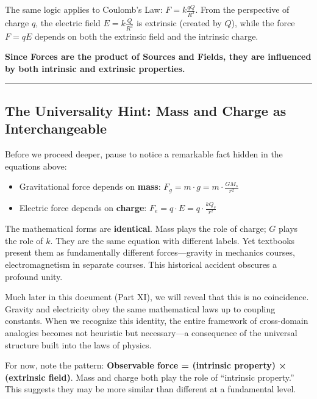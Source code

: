 \documentclass[
]{article}
\providecommand{\tightlist}{%
  \setlength{\itemsep}{0pt}\setlength{\parskip}{0pt}}
\begin{document}
The same logic applies to Coulomb's Law: \(F = k\frac{qQ}{R^2}\). From
the perspective of charge \(q\), the electric field
\(E = k\frac{Q}{R^2}\) is extrinsic (created by \(Q\)), while the force
\(F = qE\) depends on both the extrinsic field and the intrinsic charge.

\textbf{Since Forces are the product of Sources and Fields, they are
influenced by both intrinsic and extrinsic properties.}

\begin{center}\rule{0.5\linewidth}{0.5pt}\end{center}

\subsection{The Universality Hint: Mass and Charge as
Interchangeable}\label{the-universality-hint-mass-and-charge-as-interchangeable}

Before we proceed deeper, pause to notice a remarkable fact hidden in
the equations above:

\begin{itemize}
\tightlist
\item
  Gravitational force depends on \textbf{mass}:
  \(F_g = m \cdot g = m \cdot \frac{GM_s}{r^2}\)
\item
  Electric force depends on \textbf{charge}:
  \(F_e = q \cdot E = q \cdot \frac{kQ_s}{r^2}\)
\end{itemize}

The mathematical forms are \textbf{identical}. Mass plays the role of
charge; \(G\) plays the role of \(k\). They are the same equation with
different labels. Yet textbooks present them as fundamentally different
forces---gravity in mechanics courses, electromagnetism in separate
courses. This historical accident obscures a profound unity.

Much later in this document (Part XI), we will reveal that this is no
coincidence. Gravity and electricity obey the same mathematical laws up
to coupling constants. When we recognize this identity, the entire
framework of cross-domain analogies becomes not heuristic but
necessary---a consequence of the universal structure built into the laws
of physics.

For now, note the pattern: \textbf{Observable force = (intrinsic
property) × (extrinsic field)}. Mass and charge both play the role of
``intrinsic property.'' This suggests they may be more similar than
different at a fundamental level.
\end{document}
